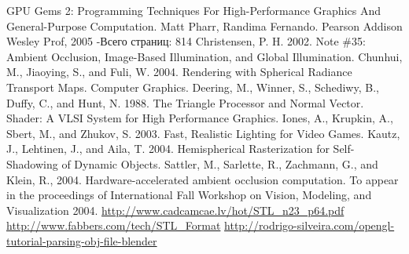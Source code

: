 











\clearpage
\begin{thebibliography}{00}
 GPU Gems 2: Programming Techniques For High-Performance Graphics And General-Purpose Computation. Matt Pharr, Randima Fernando. Pearson Addison Wesley Prof, 2005  -Всего страниц: 814
 Christensen, P. H. 2002. Note \#35: Ambient Occlusion, Image-Based Illumination, and Global Illumination.
 Chunhui, M., Jiaoying, S., and Fuli, W. 2004. Rendering with Spherical Radiance Transport Maps. Computer Graphics.
 Deering, M., Winner, S., Schediwy, B., Duffy, C., and Hunt, N. 1988. The Triangle Processor and Normal Vector. Shader: A VLSI System for High Performance Graphics.
 Iones, A., Krupkin, A., Sbert, M., and Zhukov, S. 2003. Fast, Realistic Lighting for Video Games.
 Kautz, J., Lehtinen, J., and Aila, T.  2004.  Hemispherical Rasterization for Self-Shadowing of Dynamic Objects.
 Sattler, M., Sarlette, R., Zachmann, G., and Klein, R., 2004. Hardware-accelerated ambient occlusion computation. To appear in the proceedings of International Fall Workshop on Vision, Modeling, and Visualization 2004.
 \url{http://www.cadcamcae.lv/hot/STL_n23_p64.pdf}
 \url{http://www.fabbers.com/tech/STL_Format}
 \url{http://rodrigo-silveira.com/opengl-tutorial-parsing-obj-file-blender}
\end{thebibliography}




